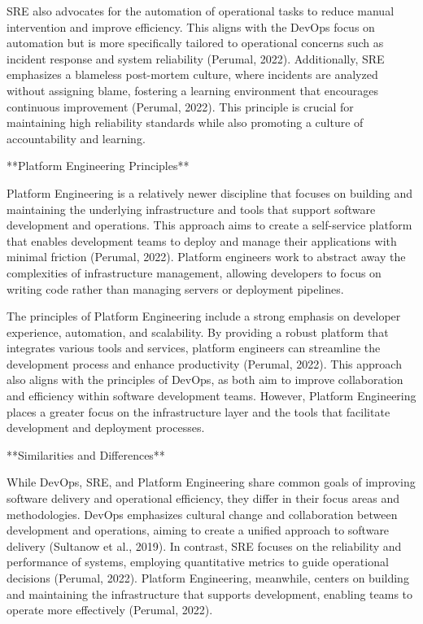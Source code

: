 SRE also advocates for the automation of operational tasks to reduce manual intervention and improve efficiency. This aligns with the DevOps focus on automation but is more specifically tailored to operational concerns such as incident response and system reliability (Perumal, 2022). Additionally, SRE emphasizes a blameless post-mortem culture, where incidents are analyzed without assigning blame, fostering a learning environment that encourages continuous improvement (Perumal, 2022). This principle is crucial for maintaining high reliability standards while also promoting a culture of accountability and learning.

**Platform Engineering Principles**

Platform Engineering is a relatively newer discipline that focuses on building and maintaining the underlying infrastructure and tools that support software development and operations. This approach aims to create a self-service platform that enables development teams to deploy and manage their applications with minimal friction (Perumal, 2022). Platform engineers work to abstract away the complexities of infrastructure management, allowing developers to focus on writing code rather than managing servers or deployment pipelines.

The principles of Platform Engineering include a strong emphasis on developer experience, automation, and scalability. By providing a robust platform that integrates various tools and services, platform engineers can streamline the development process and enhance productivity (Perumal, 2022). This approach also aligns with the principles of DevOps, as both aim to improve collaboration and efficiency within software development teams. However, Platform Engineering places a greater focus on the infrastructure layer and the tools that facilitate development and deployment processes.

**Similarities and Differences**

While DevOps, SRE, and Platform Engineering share common goals of improving software delivery and operational efficiency, they differ in their focus areas and methodologies. DevOps emphasizes cultural change and collaboration between development and operations, aiming to create a unified approach to software delivery (Sultanow et al., 2019). In contrast, SRE focuses on the reliability and performance of systems, employing quantitative metrics to guide operational decisions (Perumal, 2022). Platform Engineering, meanwhile, centers on building and maintaining the infrastructure that supports development, enabling teams to operate more effectively (Perumal, 2022).

